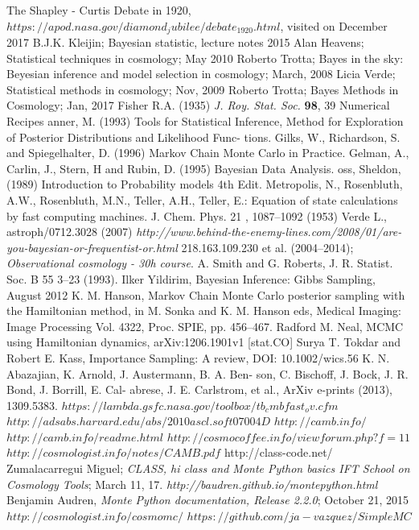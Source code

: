 \documentclass[onecolumn,           %
               showpacs,            %
               preprintnumbers,     %
               aps,                 %
               prl,          	    %
               letterpaper,             %
               superscriptaddress,      %
               nofootinbib,         %
               tightenlines,        %
               floats,floatfix      %
               ,usenatbib,
               ]{revtex4-1}
\begin{document}
\begin{thebibliography}{9}
 The Shapley - Curtis Debate in 1920, $https://apod.nasa.gov/diamond_jubilee/debate_1920.html$, visited on December 2017
B.J.K. Kleijin; Bayesian statistic, lecture notes 2015
 Alan Heavens; Statistical techniques in cosmology; May 2010
 Roberto Trotta; Bayes in the sky: Beyesian inference and model selection in cosmology; March, 2008
 Licia Verde; Statistical methods in cosmology; Nov, 2009
Roberto Trotta; Bayes Methods in Cosmology; Jan, 2017
Fisher R.A. (1935) \textit{J. Roy. Stat. Soc.} \textbf{98}, 39
Numerical Recipes
anner, M. (1993)
Tools for Statistical Inference, Method for
Exploration of Posterior Distributions and Likelihood Func-
tions.
Gilks, W., Richardson, S. and Spiegelhalter, D. (1996)
Markov Chain
Monte Carlo in Practice.
Gelman, A., Carlin, J., Stern, H and Rubin, D. (1995)
Bayesian Data
Analysis.
oss, Sheldon, (1989)
Introduction to Probability models 4th
Edit.
 Metropolis, N., Rosenbluth, A.W., Rosenbluth, M.N., Teller, A.H., Teller, E.: Equation of state
calculations by fast computing machines. J. Chem. Phys.
21
, 1087–1092 (1953)
 Verde L., astroph/0712.3028 (2007)
\textit{http://www.behind-the-enemy-lines.com/2008/01/are-you-bayesian-or-frequentist-or.html}
218.163.109.230 et al. (2004–2014); \textit{Observational cosmology -
30h course}.
 A. Smith and G. Roberts, J. R. Statist. Soc. B
55
3–23 (1993).
 Ilker Yildirim, Bayesian Inference: Gibbs Sampling, August 2012
K. M. Hanson, Markov Chain Monte Carlo posterior sampling with the Hamiltonian method, in M. Sonka and K. M. Hanson eds, Medical Imaging: Image Processing
Vol. 4322, Proc. SPIE, pp. 456–467.
 Radford M. Neal, MCMC using Hamiltonian dynamics, arXiv:1206.1901v1 [stat.CO]
 Surya T. Tokdar and Robert E. Kass, Importance Sampling: A review, DOI: 10.1002/wics.56
%
%
%
%
 K. N. Abazajian, K. Arnold, J. Austermann, B. A. Ben-
son, C. Bischoff, J. Bock, J. R. Bond, J. Borrill, E. Cal-
abrese,  J.  E.  Carlstrom,  et  al.,  ArXiv  e-prints  (2013),
1309.5383.
$https://lambda.gsfc.nasa.gov/toolbox/tb_cmbfast_ov.cfm$
$http://adsabs.harvard.edu/abs/2010ascl.soft07004D$
$http://camb.info/$
$http://camb.info/readme.html$
$http://cosmocoffee.info/viewforum.php?f=11$
 $http://cosmologist.info/notes/CAMB.pdf$
 http://class-code.net/
Zumalacarregui Miguel; \textit{CLASS, hi class and Monte Python basics IFT School on Cosmology Tools}; March 11, 17.
\textit{http://baudren.github.io/montepython.html}
Benjamin Audren, \textit{Monte Python documentation, Release 2.2.0}; October 21, 2015
$http://cosmologist.info/cosmomc/$	
$https://github.com/ja-vazquez/SimpleMC$


\end{thebibliography}
\end{document}
